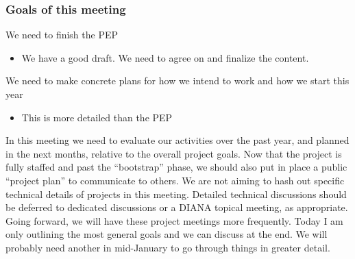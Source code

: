 \begin{frame}
\frametitle{Goals of this meeting}

We need to finish the PEP \\
\begin{itemize}
\item We have a good draft. We need to agree on and finalize the content.
\end{itemize}
\vskip 0.15in
We need to make concrete plans for how we intend to work and how we start this
year
\begin{itemize}
\item This is more detailed than the PEP
\end{itemize}
\vskip 0.15in

In this meeting we need to evaluate our activities over the past year, and planned in the next months, relative to the overall project goals. 
\vskip 0.15in
Now that the project is fully staffed and past the ``bootstrap'' phase, we should also put in place a public ``project plan'' to communicate to others.
\vskip 0.15in
We are not aiming to hash out specific technical details of projects in this meeting. Detailed technical discussions should be deferred to dedicated discussions or a DIANA topical meeting, as appropriate.
\vskip 0.15in
Going forward, we will have these project meetings more frequently. Today I am only outlining the most general goals and we can discuss at the end. We will
probably need another in mid-January to go through things in greater detail.
\vskip 0.15in
\end{frame}


